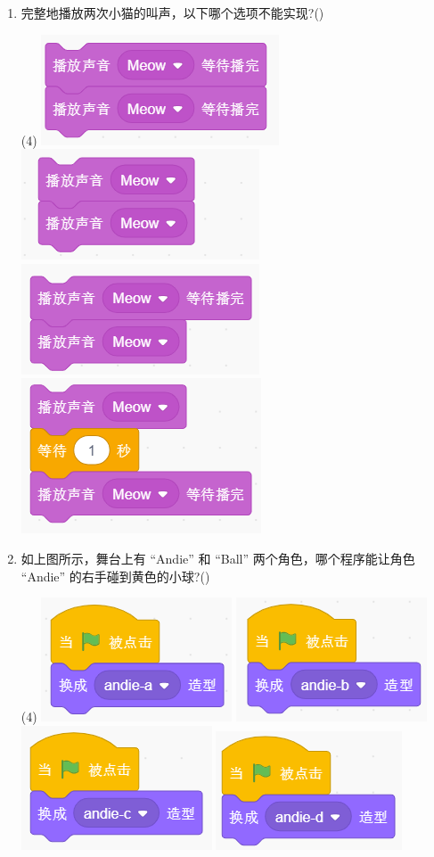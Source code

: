 \documentclass[10pt, a4paper]{article}
\begin{document}
\begin{enumerate}
        \item 完整地播放两次小猫的叫声，以下哪个选项不能实现?(\qquad)
        \begin{tasks}(4)
            \task \includegraphics[width=.18\textwidth]{5a.png}
            \task \includegraphics[width=.18\textwidth]{5b.png}
            \task \includegraphics[width=.18\textwidth]{5c.png}
            \task \includegraphics[width=.14\textwidth]{5d.png}
        \end{tasks}

        \item 如上图所示，舞台上有 “Andie” 和 “Ball” 两个角色，哪个程序能让角色 “Andie” 的右手碰到黄色的小球?(\qquad)
        \begin{tasks}(4)
            \task \includegraphics[width=.14\textwidth]{6a.png}
            \task \includegraphics[width=.14\textwidth]{6b.png}
            \task \includegraphics[width=.14\textwidth]{6c.png}
            \task \includegraphics[width=.14\textwidth]{6d.png}
        \end{tasks}


\end{enumerate}
\end{document}
